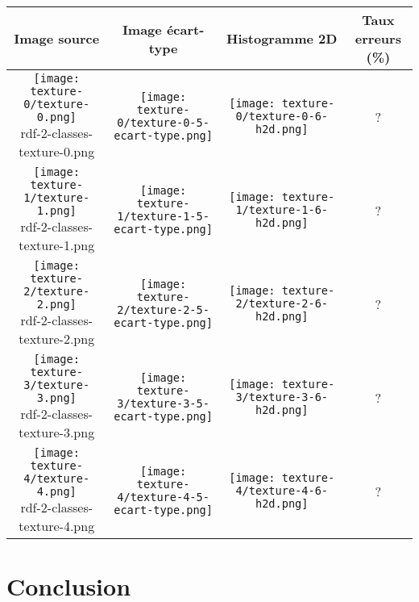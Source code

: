 \documentclass[11pt]{article}
\begin{document}
       \begin{center}
    \begin{tabular}{|c|c|c|c|}
      \hline
      \textbf{Image source} & \textbf{Image écart-type} & \textbf{Histogramme 2D} & \textbf{Taux erreurs (\%)}\\
      \hline
      \shortstack{\texttt{[image: texture-0/texture-0.png]} \\ \tiny{rdf-2-classes-texture-0.png}} & \texttt{[image: texture-0/texture-0-5-ecart-type.png]} & \texttt{[image: texture-0/texture-0-6-h2d.png]} & ?\\
      \hline
      \shortstack{\texttt{[image: texture-1/texture-1.png]} \\ \tiny{rdf-2-classes-texture-1.png}} & \texttt{[image: texture-1/texture-1-5-ecart-type.png]} & \texttt{[image: texture-1/texture-1-6-h2d.png]} & ?\\
      \hline
      \shortstack{\texttt{[image: texture-2/texture-2.png]} \\ \tiny{rdf-2-classes-texture-2.png}} & \texttt{[image: texture-2/texture-2-5-ecart-type.png]} & \texttt{[image: texture-2/texture-2-6-h2d.png]} & ?\\
      \hline
      \shortstack{\texttt{[image: texture-3/texture-3.png]} \\ \tiny{rdf-2-classes-texture-3.png}} & \texttt{[image: texture-3/texture-3-5-ecart-type.png]} & \texttt{[image: texture-3/texture-3-6-h2d.png]} & ?\\
      \hline
      \shortstack{\texttt{[image: texture-4/texture-4.png]} \\ \tiny{rdf-2-classes-texture-4.png}} & \texttt{[image: texture-4/texture-4-5-ecart-type.png]} & \texttt{[image: texture-4/texture-4-6-h2d.png]} & ?\\
      \hline
    \end{tabular}
  \end{center}
    
  \section*{Conclusion}
\end{document}

